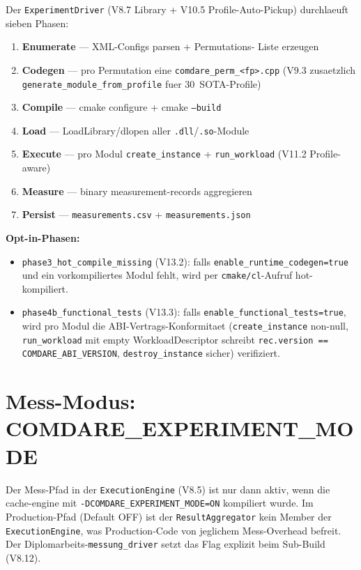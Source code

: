 Der \texttt{ExperimentDriver} (V8.7 Library + V10.5 Profile-Auto-Pickup)
durchlaeuft sieben Phasen:

\begin{enumerate}
    \item \textbf{Enumerate} --- XML-Configs parsen + Permutations-
          Liste erzeugen
    \item \textbf{Codegen} --- pro Permutation eine
          \texttt{comdare\_perm\_<fp>.cpp} (V9.3 zusaetzlich
          \texttt{generate\_module\_from\_profile} fuer 30~SOTA-Profile)
    \item \textbf{Compile} --- cmake configure + cmake \texttt{--build}
    \item \textbf{Load} --- LoadLibrary/dlopen aller
          \texttt{.dll}/\texttt{.so}-Module
    \item \textbf{Execute} --- pro Modul \texttt{create\_instance} +
          \texttt{run\_workload} (V11.2 Profile-aware)
    \item \textbf{Measure} --- binary measurement-records aggregieren
    \item \textbf{Persist} --- \texttt{measurements.csv} +
          \texttt{measurements.json}
\end{enumerate}

\textbf{Opt-in-Phasen:}

\begin{itemize}
    \item \texttt{phase3\_hot\_compile\_missing} (V13.2): falls
          \texttt{enable\_runtime\_codegen=true} und ein
          vorkompiliertes Modul fehlt, wird per \texttt{cmake/cl}-Aufruf
          hot-kompiliert.
    \item \texttt{phase4b\_functional\_tests} (V13.3): falls
          \texttt{enable\_functional\_tests=true}, wird pro Modul
          die ABI-Vertrags-Konformitaet (\texttt{create\_instance} non-null,
          \texttt{run\_workload} mit empty WorkloadDescriptor schreibt
          \texttt{rec.version == COMDARE\_ABI\_VERSION},
          \texttt{destroy\_instance} sicher) verifiziert.
\end{itemize}

\section{Mess-Modus: COMDARE\_EXPERIMENT\_MODE}

Der Mess-Pfad in der \texttt{ExecutionEngine} (V8.5) ist nur dann aktiv,
wenn die cache-engine mit \texttt{-DCOMDARE\_EXPERIMENT\_MODE=ON}
kompiliert wurde. Im Production-Pfad (Default OFF) ist der
\texttt{ResultAggregator} kein Member der \texttt{ExecutionEngine}, was
Production-Code von jeglichem Mess-Overhead befreit. Der
Diplomarbeits-\texttt{messung\_driver} setzt das Flag explizit beim
Sub-Build (V8.12).

